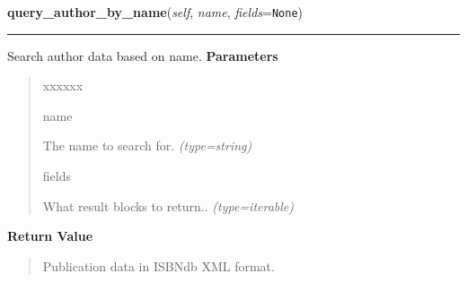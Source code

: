 \hspace{.8\funcindent}\begin{boxedminipage}{\funcwidth}

    \raggedright \textbf{query\_author\_by\_name}(\textit{self}, \textit{name}, \textit{fields}={\tt None})

    \vspace{-1.5ex}

    \rule{\textwidth}{0.5\fboxrule}
\setlength{\parskip}{2ex}

Search author data based on name.
\setlength{\parskip}{1ex}
      \textbf{Parameters}
      \vspace{-1ex}

      \begin{quote}
        \begin{Ventry}{xxxxxx}

          \item[name]


The name to search for.
            {\it (type=string)}

          \item[fields]


What result blocks to return..
            {\it (type=iterable)}

        \end{Ventry}

      \end{quote}

      \textbf{Return Value}
    \vspace{-1ex}

      \begin{quote}

Publication data in ISBNdb XML format.
      \end{quote}

    \end{boxedminipage}

    \label{biblio:webquery:isbndb:IsbndbQuery:query_author_by_id}

    \vspace{0.5ex}

